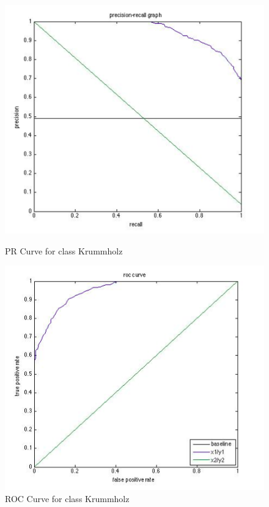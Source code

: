 \documentclass[11pt]{article}
\begin{document}
\begin{figure}[htbp]
\begin{minipage}[b]{0.5\linewidth}
\centering
\includegraphics[width=\linewidth]{KrummholzPRCurve.png}
\caption{PR Curve for class Krummholz}
\label{fig:chapter001_dist_001}
\end{minipage}
\hspace{0.5cm}
\begin{minipage}[b]{0.5\linewidth}
\centering
\includegraphics[width=\linewidth]{KrummholzROCCurve.png}
\caption{ROC Curve for class Krummholz}
\label{fig:chapter001_reward_001}
\end{minipage}
\end{figure}
\end{document}
